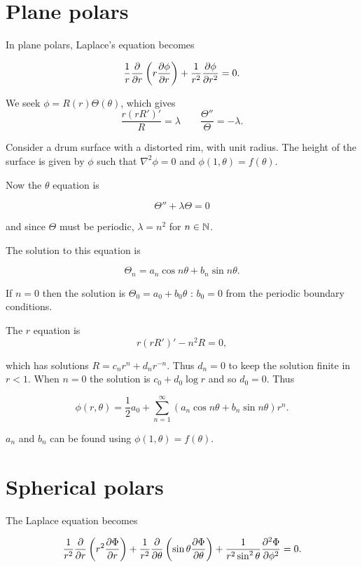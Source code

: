 \documentclass{notes}
\theoremstyle{plain}
\begin{document}
\section{Plane polars}

In plane polars, Laplace's equation becomes

\begin{equation}\label{eq:LapPlane}
\frac{1}{r} \frac{\partial }{\partial r} \left(r \frac{\partial \phi}{\partial r} \right) + \frac{1}{r^2}
\frac{\partial \phi}{\partial r^2} = 0.
\end{equation}

We seek $\phi = R(r) \Theta(\theta)$, which gives
\[
\frac{r (r R')'}{R} = \lambda \qquad \frac{\Theta''}{\Theta} = -\lambda.
\]

Consider a drum surface with a distorted rim, with unit radius.  The
height of the surface is given by $\phi$ such that $\nabla^2 \phi = 0$
and $\phi(1,\theta) = f(\theta)$.

Now the $\theta$ equation is

\[
\Theta'' + \lambda \Theta = 0
\]

and since $\Theta$ must be periodic, $\lambda = n^2$ for $n \in \mathbb{N}$.

The solution to this equation is

\[
\Theta_n = a_n \cos n \theta + b_n \sin n \theta.
\]

If $n=0$ then the solution is $\Theta_0 = a_0 + b_0 \theta$ : $b_0 =
0$ from the periodic boundary conditions.

The $r$ equation is
\[
r (r R')' - n^2 R = 0,
\]

which has solutions $R = c_n r^n + d_n r^{-n}$.  Thus $d_n = 0$ to
keep the solution finite in $r < 1$.  When $n = 0$ the solution is
$c_0 + d_0 \log r$ and so $d_0 = 0$.  Thus

\[
\phi(r,\theta) = \frac{1}{2} a_0 + \sum_{n=1}^\infty \left( a_n \cos n
\theta + b_n \sin n \theta \right) r^n.
\]

$a_n$ and $b_n$ can be found using $\phi(1,\theta) = f(\theta)$.

\section{Spherical polars}

The Laplace equation becomes

\begin{equation}\label{eq:sphLap}
\frac{1}{r^2} \frac{\partial }{\partial r} \left(r^2 \frac{\partial \Phi}{\partial r} \right) +
\frac{1}{r^2} \frac{\partial }{\partial \theta}
\left( \sin \theta \frac{\partial \Phi}{\partial \theta} \right) +
\frac{1}{r^2 \sin^2 \theta} \frac{\partial ^2 \Phi}{\partial \phi^2} = 0.
\end{equation}
\end{document}
